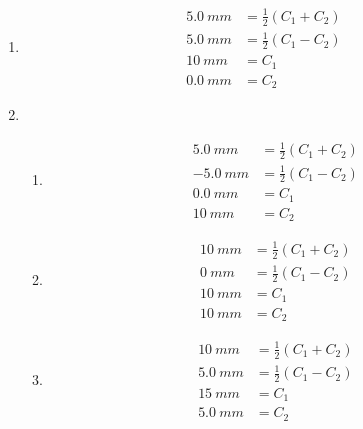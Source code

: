 \documentclass{article}
\begin{document}
\subsection{}

\begin{enumerate}
  \item

        \begin{align*}
          \qty{5.0}{mm} & = \frac{1}{2} (C_1 + C_2) \\
          \qty{5.0}{mm} & = \frac{1}{2} (C_1 - C_2) \\
          \qty{10}{mm}  & = C_1                     \\
          \qty{0.0}{mm} & = C_2
        \end{align*}

  \item

        \begin{enumerate}
          \item

                \begin{align*}
                  \qty{5.0}{mm}  & = \frac{1}{2} (C_1 + C_2) \\
                  \qty{-5.0}{mm} & = \frac{1}{2} (C_1 - C_2) \\
                  \qty{0.0}{mm}  & = C_1                     \\
                  \qty{10}{mm}   & = C_2
                \end{align*}

          \item

                \begin{align*}
                  \qty{10}{mm} & = \frac{1}{2} (C_1 + C_2) \\
                  \qty{0}{mm}  & = \frac{1}{2} (C_1 - C_2) \\
                  \qty{10}{mm} & = C_1                     \\
                  \qty{10}{mm} & = C_2
                \end{align*}

          \item

                \begin{align*}
                  \qty{10}{mm}  & = \frac{1}{2} (C_1 + C_2) \\
                  \qty{5.0}{mm} & = \frac{1}{2} (C_1 - C_2) \\
                  \qty{15}{mm}  & = C_1                     \\
                  \qty{5.0}{mm} & = C_2
                \end{align*}
        \end{enumerate}
\end{enumerate}
\end{document}
